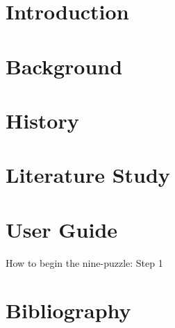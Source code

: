 \documentclass[10pt]{article}
\begin{document}
\section*{Introduction}

\section*{Background}

\section*{History}

\section*{Literature Study}

\section*{User Guide}
How to begin the nine-puzzle:
Step 1
\section*{Bibliography}
\end{document}
